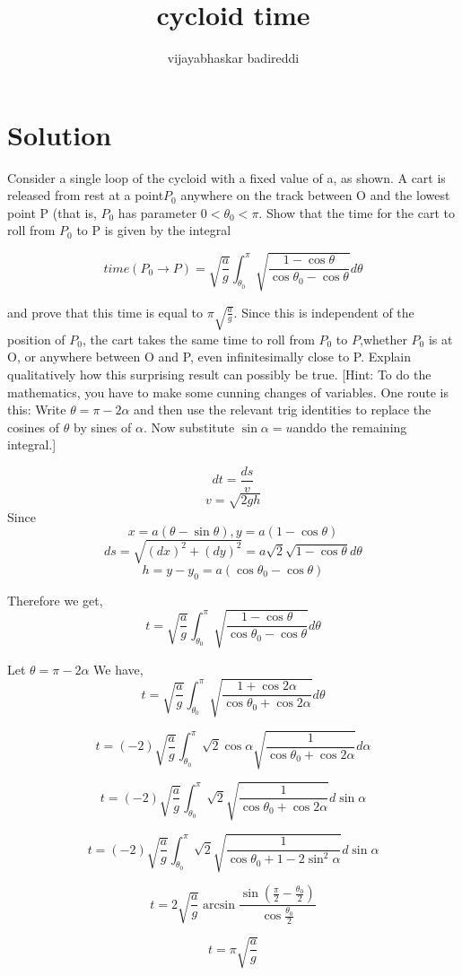 \documentclass[12pt]{article}
\title{cycloid time}
\author{vijayabhaskar badireddi}
\date{}
\begin{document}

\section{Solution}

Consider a single loop of the cycloid with a fixed value of a, as shown. A cart is released from rest at a point$ P_0$ anywhere on the track between O and the lowest point P (that is, $P_0$ has parameter
\( 0 < \theta_0 < \pi \). Show that the time for the cart to roll from  $P_0$ to P is given by the integral

\[ time(P_0 \to P) = \sqrt{\frac{a}{g}} \int_{\theta_0}^{\pi} \sqrt{\frac{1- \cos{\theta}}{\cos{\theta_0}-\cos{\theta}}}d\theta\]

and prove that this time is equal to $\pi \sqrt{\frac{a}{g}}$. Since this is independent of the position of $P_0$, the cart takes the same time to roll from  $P_0$ to  $P$,whether $P_0$ is at O, or anywhere between O and P, even infinitesimally close to P. Explain qualitatively how this surprising result can possibly be true. [Hint: To do the mathematics, you have to make some cunning changes of variables. One route is this: Write $ \theta = \pi - 2\alpha$ and then use the relevant trig identities to replace the cosines of $\theta$ by sines of $\alpha$. Now substitute $\sin{\alpha} = u $anddo the remaining integral.]

 \[dt= \frac{ds}{v}\] 
\[ v= \sqrt{2gh} \] 
Since \[ x= a(\theta - \sin{\theta}), y=a(1-\cos{\theta})\]
\[ds = \sqrt{(dx)^2+(dy)^2} = a \sqrt{2} \sqrt{1-\cos\theta} d\theta\]
 \[h = y - y_0 = a (\cos\theta_0 - \cos\theta)\] 

Therefore we get,
\[ t = \sqrt{\frac{a}{g}} \int_{\theta_0}^{\pi}\sqrt{\frac{1-\cos\theta}{\cos\theta_0 - \cos\theta}} d\theta \]

Let \( \theta = \pi - 2\alpha\)
We have,
\[ t = \sqrt{\frac{a}{g}} \int_{\theta_0}^{\pi}\sqrt{\frac{1+\cos{2\alpha}}{\cos\theta_0 + \cos{2\alpha}}} d\theta \]

\[ t = (-2) \sqrt{\frac{a}{g}} \int_{\theta_0}^{\pi} \sqrt{2} \cos{\alpha} \sqrt{\frac{1}{\cos\theta_0 + \cos{2\alpha}}} d\alpha \]

\[ t = (-2) \sqrt{\frac{a}{g}} \int_{\theta_0}^{\pi} \sqrt{2}  \sqrt{\frac{1}{\cos\theta_0 + \cos{2\alpha}}} d\sin\alpha \]


\[ t = (-2) \sqrt{\frac{a}{g}} \int_{\theta_0}^{\pi} \sqrt{2}  \sqrt{\frac{1}{\cos\theta_0 + 1 - 2\sin^2{\alpha}}} d\sin\alpha \]

 \[t = 2 \sqrt{\frac{a}{g}} \arcsin{\frac{\sin{(\frac{\pi}{2}-\frac{\theta_0}{2})}}{\cos{\frac{\theta_0}{2}}}} \]

\[t = \pi \sqrt{\frac{a}{g}} \]
\end{document}
